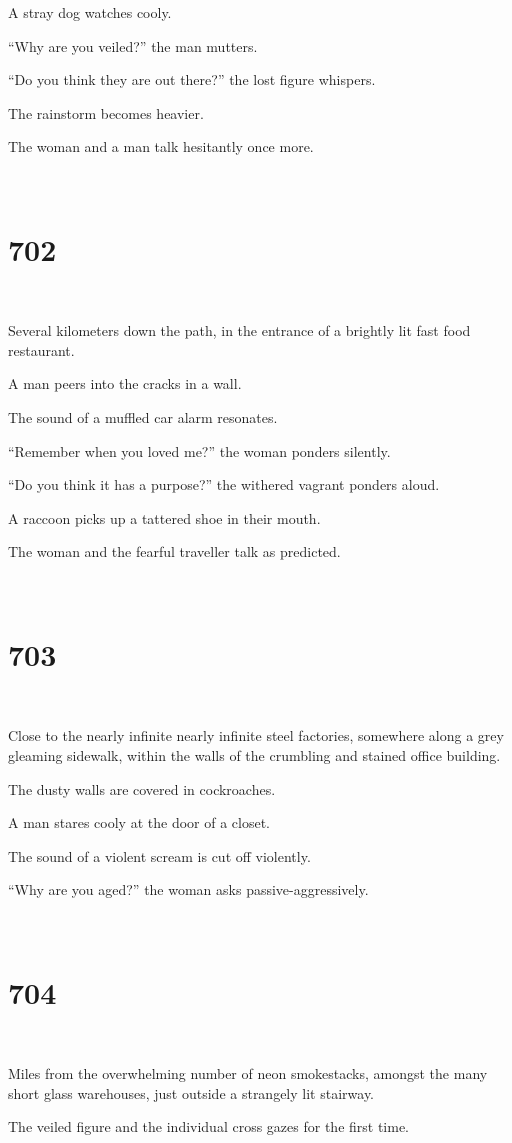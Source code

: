 \documentclass{report}
\begin{document}
A stray dog watches cooly.

``Why are you veiled?'' the man mutters.

``Do you think they are out there?'' the lost figure whispers.

The rainstorm becomes heavier.

The woman and a man talk hesitantly once more.

~
\chapter*{702}
~

Several kilometers down the path, in the entrance of a brightly lit fast food restaurant.

A man peers into the cracks in a wall.

The sound of a muffled car alarm resonates.

``Remember when you loved me?'' the woman ponders silently.

``Do you think it has a purpose?'' the withered vagrant ponders aloud.

A raccoon picks up a tattered shoe in their mouth.

The woman and the fearful traveller talk as predicted.

~
\chapter*{703}
~

Close to the nearly infinite nearly infinite steel factories, somewhere along a grey gleaming sidewalk, within the walls of the crumbling and stained office building.

The dusty walls are covered in cockroaches.

A man stares cooly at the door of a closet.

The sound of a violent scream is cut off violently.

``Why are you aged?'' the woman asks passive-aggressively.

~
\chapter*{704}
~

Miles from the overwhelming number of neon smokestacks, amongst the many short glass warehouses, just outside a strangely lit stairway.

The veiled figure and the individual cross gazes for the first time.
\end{document}
